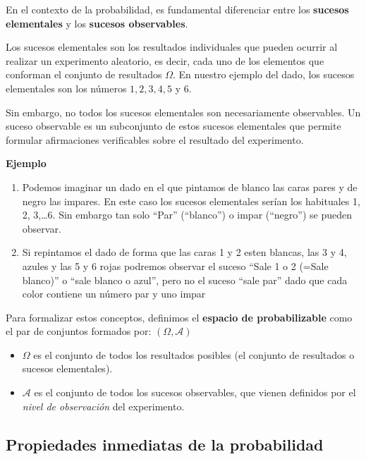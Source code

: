 \documentclass[
]{article}
\providecommand{\tightlist}{%
  \setlength{\itemsep}{0pt}\setlength{\parskip}{0pt}}
\begin{document}
En el contexto de la probabilidad, es fundamental diferenciar entre los \textbf{sucesos elementales} y los \textbf{sucesos observables}.

Los sucesos elementales son los resultados individuales que pueden ocurrir al realizar un experimento aleatorio, es decir, cada uno de los elementos que conforman el conjunto de resultados \(\Omega\). En nuestro ejemplo del dado, los sucesos elementales son los números \(1, 2, 3, 4, 5\) y \(6\).

Sin embargo, no todos los sucesos elementales son necesariamente observables. Un suceso observable es un subconjunto de estos sucesos elementales que permite formular afirmaciones verificables sobre el resultado del experimento.

\textbf{Ejemplo}

\begin{enumerate}
\def\labelenumi{\arabic{enumi}.}
\item
  Podemos imaginar un dado en el que pintamos de blanco las caras pares y de negro las impares. En este caso los sucesos elementales serían los habituales 1, 2, 3,\ldots6.
  Sin embargo tan solo ``Par'' (``blanco'') o impar (``negro'') se pueden observar.
\item
  Si repintamos el dado de forma que las caras 1 y 2 esten blancas, las 3 y 4, azules y las 5 y 6 rojas podremos observar el suceso ``Sale 1 o 2 (=Sale blanco)'' o ``sale blanco o azul'', pero no el suceso ``sale par'' dado que cada color contiene un número par y uno impar
\end{enumerate}

Para formalizar estos conceptos, definimos el \textbf{espacio de probabilizable} como el par de conjuntos formados por: \((\Omega, \mathcal{A})\)

\begin{itemize}
\tightlist
\item
  \(\Omega\) es el conjunto de todos los resultados posibles (el conjunto de resultados o sucesos elementales).
\item
  \(\mathcal{A}\) es el conjunto de todos los sucesos observables, que vienen definidos por el \emph{nivel de observación} del experimento.
\end{itemize}

\subsection{Propiedades inmediatas de la probabilidad}\label{propiedades-inmediatas-de-la-probabilidad}
\end{document}
